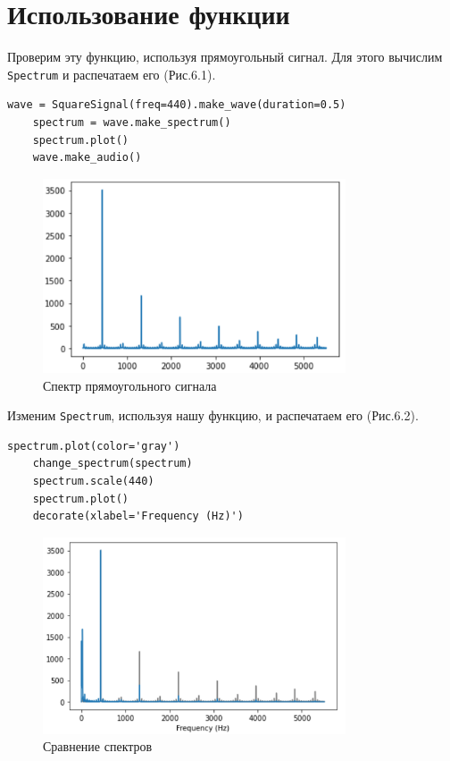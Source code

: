 \documentclass[a4paper,12pt]{report}
\begin{document}
\section{Использование функции}
    Проверим эту функцию, используя прямоугольный сигнал. Для этого вычислим \texttt{Spectrum} и распечатаем его (Рис.6.1).
\begin{lstlisting}[caption=Вычисление спектра]
    wave = SquareSignal(freq=440).make_wave(duration=0.5)
    spectrum = wave.make_spectrum()
    spectrum.plot()
    wave.make_audio()
\end{lstlisting}

\begin{figure}[H]
        \centering
        \includegraphics[width=0.8\textwidth]{fig6-1.PNG}
        \caption{Спектр прямоугольного сигнала}
        \label{fig:fig6-1}
\end{figure}   

    Изменим \texttt{Spectrum}, используя нашу функцию, и распечатаем его (Рис.6.2).
\begin{lstlisting}[caption=Вычисление нового спектра]
    spectrum.plot(color='gray')
    change_spectrum(spectrum)
    spectrum.scale(440)
    spectrum.plot()
    decorate(xlabel='Frequency (Hz)')
\end{lstlisting}

\begin{figure}[H]
        \centering
        \includegraphics[width=0.8\textwidth]{fig6-2.PNG}
        \caption{Сравнение спектров}
        \label{fig:fig6-2}
\end{figure}     
\end{document}
